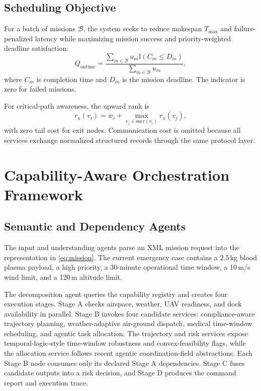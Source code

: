 \documentclass[conference]{IEEEtran}
\begin{document}
\subsection{Scheduling Objective}

For a batch of missions $\mathcal{B}$, the system seeks to reduce makespan
$T_{\max}$ and failure-penalized latency while maximizing mission success and
priority-weighted deadline satisfaction:
\begin{equation}
Q_{\mathrm{ontime}} =
\frac{\sum_{m\in\mathcal{B}}u_m
\mathbb{I}(C_m\leq D_m)}
{\sum_{m\in\mathcal{B}}u_m},
\label{eq:weighted}
\end{equation}
where $C_m$ is completion time and $D_m$ is the mission deadline. The
indicator is zero for failed missions.

For critical-path awareness, the upward rank is
\begin{equation}
r_u(v_i)=\bar{w}_i+
\max_{v_j\in\mathrm{succ}(v_i)} r_u(v_j),
\label{eq:rank}
\end{equation}
with zero tail cost for exit nodes. Communication cost is omitted because
all services exchange normalized structured records through the same
protocol layer.

\section{Capability-Aware Orchestration Framework}

\subsection{Semantic and Dependency Agents}

The input and understanding agents parse an XML mission request into the
representation in \eqref{eq:mission}. The current emergency case contains a
2.5\,kg blood plasma payload, a high priority, a 30-minute operational time
window, a 10\,m/s wind limit, and a 120\,m altitude limit.

The decomposition agent queries the capability registry and creates four
execution stages. Stage A checks airspace, weather, UAV readiness, and dock
availability in parallel. Stage B invokes four candidate services:
compliance-aware trajectory planning, weather-adaptive air-ground dispatch,
medical time-window scheduling, and agentic task allocation. The trajectory
and risk services expose temporal-logic-style time-window robustness and
convex-feasibility flags, while the allocation service follows recent
agentic coordination-field abstractions. Each Stage B node consumes only its
declared Stage A dependencies. Stage C fuses candidate outputs into a risk
decision, and Stage D produces the command report and execution trace.
\end{document}
